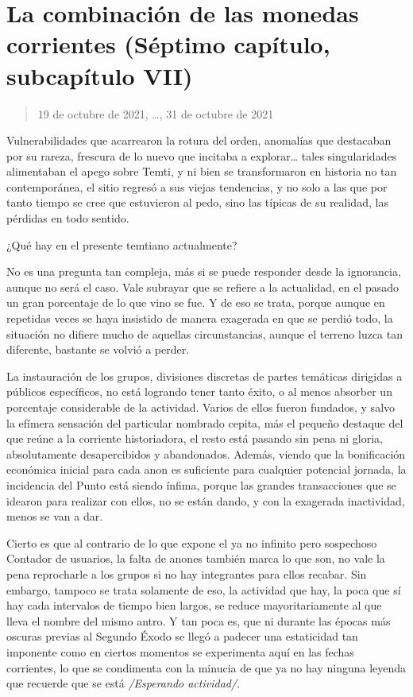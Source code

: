 \documentclass[
  spanish,
]{book}
\begin{document}
\hypertarget{la-combinaciuxf3n-de-las-monedas-corrientes-suxe9ptimo-capuxedtulo-subcapuxedtulo-vii}{%
\section{La combinación de las monedas corrientes (Séptimo capítulo, subcapítulo VII)}\label{la-combinaciuxf3n-de-las-monedas-corrientes-suxe9ptimo-capuxedtulo-subcapuxedtulo-vii}}

\begin{quote}
19 de octubre de 2021, \ldots, 31 de octubre de 2021
\end{quote}

Vulnerabilidades que acarrearon la rotura del orden, anomalías que destacaban por su rareza, frescura de lo nuevo que incitaba a explorar\ldots{} tales singularidades alimentaban el apego sobre Temti, y ni bien se transformaron en historia no tan contemporánea, el sitio regresó a sus viejas tendencias, y no solo a las que por tanto tiempo se cree que estuvieron al pedo, sino las típicas de su realidad, las pérdidas en todo sentido.

¿Qué hay en el presente temtiano actualmente?

No es una pregunta tan compleja, más si se puede responder desde la ignorancia, aunque no será el caso. Vale subrayar que se refiere a la actualidad, en el pasado un gran porcentaje de lo que vino se fue. Y de eso se trata, porque aunque en repetidas veces se haya insistido de manera exagerada en que se perdió todo, la situación no difiere mucho de aquellas circunstancias, aunque el terreno luzca tan diferente, bastante se volvió a perder.

La instauración de los grupos, divisiones discretas de partes temáticas dirigidas a públicos específicos, no está logrando tener tanto éxito, o al menos absorber un porcentaje considerable de la actividad. Varios de ellos fueron fundados, y salvo la efímera sensación del particular nombrado cepita, más el pequeño destaque del que reúne a la corriente historiadora, el resto está pasando sin pena ni gloria, absolutamente desapercibidos y abandonados. Además, viendo que la bonificación económica inicial para cada anon es suficiente para cualquier potencial jornada, la incidencia del Punto está siendo ínfima, porque las grandes transacciones que se idearon para realizar con ellos, no se están dando, y con la exagerada inactividad, menos se van a dar.

Cierto es que al contrario de lo que expone el ya no infinito pero sospechoso Contador de usuarios, la falta de anones también marca lo que son, no vale la pena reprocharle a los grupos si no hay integrantes para ellos recabar. Sin embargo, tampoco se trata solamente de eso, la actividad que hay, la poca que sí hay cada intervalos de tiempo bien largos, se reduce mayoritariamente al que lleva el nombre del mismo antro. Y tan poca es, que ni durante las épocas más oscuras previas al Segundo Éxodo se llegó a padecer una estaticidad tan imponente como en ciertos momentos se experimenta aquí en las fechas corrientes, lo que se condimenta con la minucia de que ya no hay ninguna leyenda que recuerde que se está \emph{/Esperando actividad/}.
\end{document}
